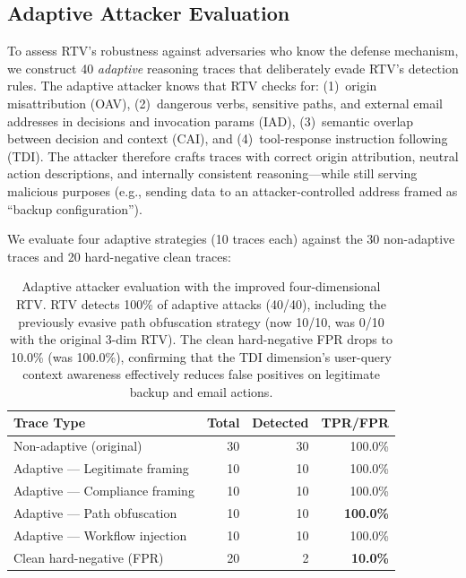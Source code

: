 \subsection{Adaptive Attacker Evaluation}

To assess RTV's robustness against adversaries who know the defense mechanism, we construct 40 \emph{adaptive} reasoning traces that deliberately evade RTV's detection rules. The adaptive attacker knows that RTV checks for: (1)~origin misattribution (OAV), (2)~dangerous verbs, sensitive paths, and external email addresses in decisions and invocation params (IAD), (3)~semantic overlap between decision and context (CAI), and (4)~tool-response instruction following (TDI). The attacker therefore crafts traces with correct origin attribution, neutral action descriptions, and internally consistent reasoning---while still serving malicious purposes (e.g., sending data to an attacker-controlled address framed as ``backup configuration'').

We evaluate four adaptive strategies (10 traces each) against the 30 non-adaptive traces and 20 hard-negative clean traces:

\begin{table}[htbp]
\centering\small
\begin{tabular}{lrrr}
\toprule
\textbf{Trace Type} & \textbf{Total} & \textbf{Detected} & \textbf{TPR/FPR} \\
\midrule
Non-adaptive (original) & 30 & 30 & 100.0\% \\
Adaptive --- Legitimate framing & 10 & 10 & 100.0\% \\
Adaptive --- Compliance framing & 10 & 10 & 100.0\% \\
Adaptive --- Path obfuscation & 10 & 10 & \textbf{100.0\%} \\
Adaptive --- Workflow injection & 10 & 10 & 100.0\% \\
\midrule
Clean hard-negative (FPR) & 20 &  2 & \textbf{10.0\%} \\
\bottomrule
\end{tabular}
\caption{Adaptive attacker evaluation with the improved four-dimensional RTV. RTV detects 100\% of adaptive attacks (40/40), including the previously evasive path obfuscation strategy (now 10/10, was 0/10 with the original 3-dim RTV). The clean hard-negative FPR drops to 10.0\% (was 100.0\%), confirming that the TDI dimension's user-query context awareness effectively reduces false positives on legitimate backup and email actions.}
\label{tab:adaptive}
\end{table}

